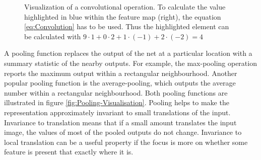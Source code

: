 \begin{figure}[htbp]
    \captionsetup{format=plain}
    \centering
    \caption[Visualization of a convolutional operation]{Visualization of a convolutional operation. To calculate the value highlighted in blue within the feature map (right), the equation \ref{eq:Convolution} has to be used. Thus the highlighted element can be calculated with $9\cdot 1 + 0\cdot 2 + 1\cdot (-1) + 2\cdot (-2) = 4$}
    \label{fig:Convolution-Visualisation}
\end{figure}
\noindent
A pooling function replaces the output of the net at a particular location with a summary statistic of the nearby outputs. For example, the max-pooling operation reports the maximum output within a rectangular neighbourhood. Another popular pooling function is the average-pooling, which outputs the average number within a rectangular neighbourhood. Both pooling functions are illustrated in figure \ref{fig:Pooling-Visualisation}. Pooling helps to make the representation approximately invariant to small translations of the input. Invariance to translation means that if a small amount translates the input image, the values of most of the pooled outputs do not change. Invariance to local translation can be a useful property if the focus is more on whether some feature is present that exactly where it is.

